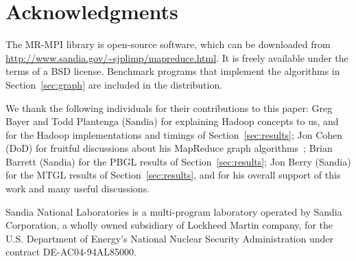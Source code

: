 \section{Acknowledgments}
\label{sec:thanks}

The MR-MPI library is open-source software, which can be downloaded
from \url{http://www.sandia.gov/~sjplimp/mapreduce.html}.  It is
freely available under the terms of a BSD license.  Benchmark programs
that implement the algorithms in Section~\ref{sec:graph} 
are included in the distribution.

We thank the following individuals for their contributions to this
paper: Greg Bayer and Todd Plantenga (Sandia) for explaining Hadoop
concepts to us, and for the Hadoop implementations and timings of
Section~\ref{sec:results}; Jon Cohen (DoD) for fruitful discussions
about his MapReduce graph algorithms~\cite{Cohen09}; Brian Barrett
(Sandia) for the PBGL results of Section~\ref{sec:results}; Jon Berry
(Sandia) for the MTGL results of Section~\ref{sec:results}, and for
his overall support of this work and many useful discussions.

Sandia National Laboratories is a multi-program laboratory operated by
Sandia Corporation, a wholly owned subsidiary of Lockheed Martin
company, for the U.S. Department of Energy's National Nuclear Security
Administration under contract DE-AC04-94AL85000.
